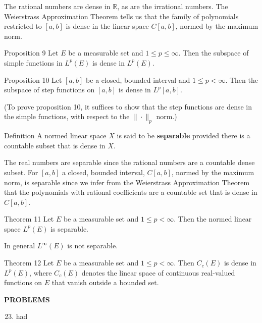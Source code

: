 The rational numbers are dense in $\mathbb{R}$, as are the irrational numbers.
The Weierstrass Approximation Theorem tells us that the family of polynomials restricted to $[a,b]$ is dense in the linear space $C[a,b]$, normed by the maximum norm.

\begin{namedthm*}{Proposition 9}
	Let $E$ be a measurable set and $1\le p\le\infty$.
	Then the subspace of simple functions in $L^p(E)$ is dense in $L^p(E)$.
\end{namedthm*}
\begin{namedthm*}{Proposition 10}
	Let $[a,b]$ be a closed, bounded interval and $1\le p<\infty$.
	Then the subspace of step functions on $[a,b]$ is dense in $L^p[a,b]$.
\end{namedthm*}
(To prove proposition 10, it suffices to show that the step functions are dense in the simple functions, with respect to the $\|\cdot\|_p$ norm.)
\begin{namedthm*}{Definition}
	A normed linear space $X$ is said to be \textbf{separable} provided there is a countable subset that is dense in $X$.
\end{namedthm*}
The real numbers are separable since the rational numbers are a countable dense subset.
For $[a,b]$ a closed, bounded interval, $C[a,b]$, normed by the maximum norm, is separable since we infer from the Weierstrass Approximation Theorem that the polynomials with rational coefficients are a countable set that is dense in $C[a,b]$.
\begin{namedthm*}{Theorem 11}
	Let $E$ be a measurable set and $1\le p<\infty$.
	Then the normed linear space $L^p(E)$ is separable.
\end{namedthm*}
In general $L^\infty(E)$ is not separable.
\begin{namedthm*}{Theorem 12}
	Let $E$ be a measurable set and $1\le p<\infty$.
	Then $C_c(E)$ is dense in $L^p(E)$, where $C_c(E)$ denotes the linear space of continuous real-valued functions on $E$ that vanish outside a bounded set.
\end{namedthm*}

\begin{center}
	\textbf{PROBLEMS}
\end{center}
\begin{enumerate}
	\setcounter{enumi}{22}
	\item had
\end{enumerate}
